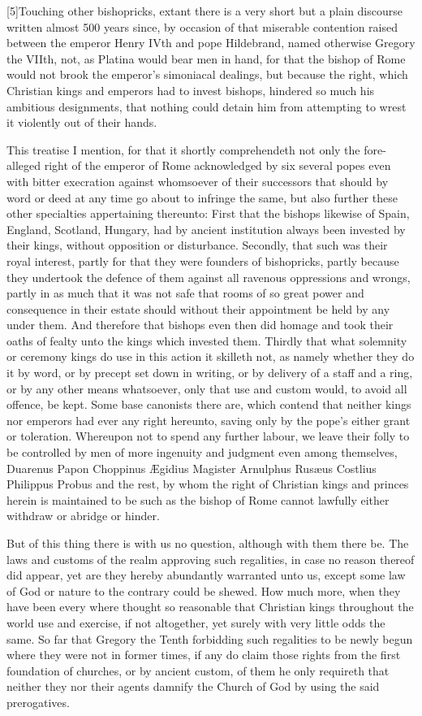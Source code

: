 [5]Touching other bishopricks, extant there is a very short but a plain discourse written almost 500 years since, by occasion of that miserable contention raised between the emperor Henry IVth and pope Hildebrand, named otherwise Gregory the VIIth, not, as Platina would bear men in hand, for that the bishop of Rome would not brook the emperor’s simoniacal dealings, but because the right, which Christian kings and emperors had to invest bishops, hindered so much his ambitious designments, that nothing could detain him from attempting to wrest it violently out of their hands.

This treatise I mention, for that it shortly comprehendeth not only the fore-alleged right of the emperor of Rome acknowledged by six several popes even with bitter execration against whomsoever of their successors that should by word or deed at any time go about to infringe the same, but also further these other specialties appertaining thereunto: First that the bishops likewise of Spain, England, Scotland, Hungary, had by ancient institution always been invested by their kings, without opposition or disturbance. Secondly, that such  was their royal interest, partly for that they were founders of bishopricks, partly because they undertook the defence of them against all ravenous oppressions and wrongs, partly in as much that it was not safe that rooms of so great power and consequence in their estate should without their appointment be held by any under them. And therefore that bishops even then did homage and took their oaths of fealty unto the kings which invested them. Thirdly that what solemnity or ceremony kings do use in this action it skilleth not, as namely whether they do it by word, or by precept set down in writing, or by delivery of a staff and a ring, or by any other means whatsoever, only that use and custom would, to avoid all offence, be kept. Some base canonists there are, which contend that neither kings nor emperors had ever any right hereunto, saving only by the pope’s either grant or toleration. Whereupon not to spend any further labour, we leave their folly to be controlled by men of more ingenuity and judgment even among themselves,  Duarenus Papon Choppinus Ægidius Magister Arnulphus Rusæus Costlius Philippus Probus and the rest, by whom the right of Christian kings and princes herein is maintained to be such as the bishop of Rome cannot lawfully either withdraw or abridge or hinder.

But of this thing there is with us no question, although with them there be. The laws and customs of the realm approving such regalities, in case no reason thereof did appear, yet are they hereby abundantly warranted unto us, except some law of God or nature to the contrary could be shewed. How much more, when they have been every where thought so reasonable that Christian kings throughout the world use and exercise, if not altogether, yet surely with very little odds the same. So far that Gregory the Tenth forbidding such regalities to be newly begun where they were not in former  times, if any do claim those rights from the first foundation of churches, or by ancient custom, of them he only requireth that neither they nor their agents damnify the Church of God by using the said prerogatives.

